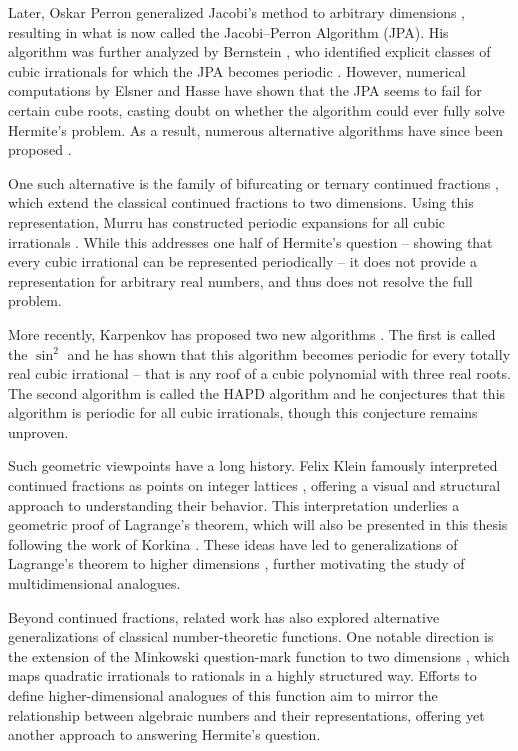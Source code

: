 Later, Oskar Perron generalized Jacobi's method to arbitrary dimensions \cite{Perron07},
resulting in what is now called the Jacobi–Perron Algorithm (JPA).
His algorithm was further analyzed by Bernstein \cite{Bernstein71},
who identified explicit classes of cubic irrationals for which the JPA
becomes periodic \cite{Bernstein64A, Bernstein65, Bernstein64B}.
However, numerical computations by Elsner and Hasse \cite{Elsner67} have shown
that the JPA seems to fail for certain cube roots,
casting doubt on whether the algorithm could ever fully solve Hermite’s
problem.
As a result, numerous alternative algorithms have since been proposed
\cite{Schweiger00, Hendy81, Schweiger13}.

One such alternative is the family of bifurcating or ternary continued
fractions \cite{Gupta00},
which extend the classical continued fractions to two dimensions.
Using this representation, Murru has constructed periodic expansions for all cubic irrationals \cite{Murru15}.
While this addresses one half of Hermite’s question -- showing that every cubic
irrational can be represented periodically -- it does not provide a
representation for arbitrary real numbers, and thus does not resolve the full
problem.

More recently, Karpenkov has proposed two new algorithms \cite{Karpenkov21, Karpenkov24}.
The first is called the $\sin^2$ and he has shown that this algorithm
becomes periodic for every totally real cubic irrational -- that is any roof of a cubic polynomial with three real roots.
The second algorithm is called the HAPD algorithm \cite{Karpenkov24} and he
conjectures that this algorithm is periodic for all cubic irrationals,
though this conjecture remains unproven.

Such geometric viewpoints have a long history. Felix Klein famously interpreted
continued fractions as points on integer lattices \cite{Klein95}, offering
a visual and structural approach to understanding their behavior.
This interpretation underlies a geometric proof of Lagrange’s theorem, which will
also be presented in this thesis following the work of Korkina \cite{Korkina96}.
These ideas have led to generalizations of Lagrange’s theorem
to higher dimensions \cite{German08}, further motivating the study of
multidimensional analogues.

Beyond continued fractions, related work has also explored alternative
generalizations of classical number-theoretic functions.
One notable direction is the extension of the Minkowski question-mark function
to two dimensions \cite{Beaver04}, which maps quadratic irrationals to rationals in a highly structured way.
Efforts to define higher-dimensional analogues of this function aim to mirror
the relationship between algebraic numbers and their representations,
offering yet another approach to answering Hermite’s question.

